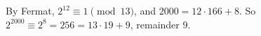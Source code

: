 By Fermat, $2^{12}\equiv1\pmod{13}$, and $2000=12\cdot166+8$. So $2^{2000}\equiv2^8=256=13\cdot19+9$, remainder $\boxed{9}$.
